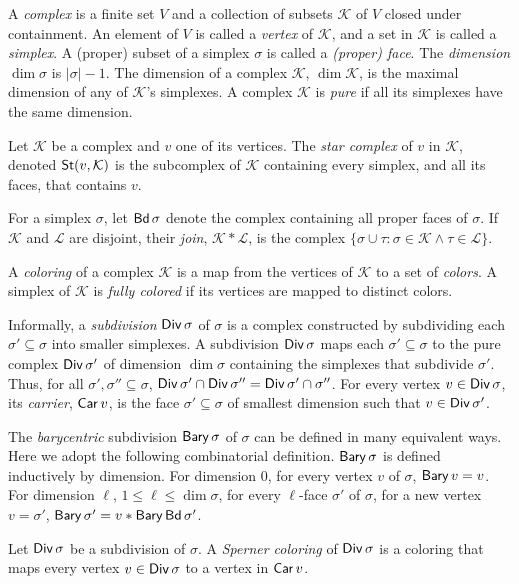 \documentclass[11pt]{article}
\theoremstyle{definition}
\newcommand{\set}[1]{\{#1\}}
\DeclareMathOperator{\Bary}{\sf Bary}
\DeclareMathOperator{\Star}{\sf St}
\DeclareMathOperator{\Car}{\sf Car}
\DeclareMathOperator{\Div}{\sf Div}
\DeclareMathOperator{\bdry}{\sf Bd}
\newcommand{\cK}{\ensuremath{\mathcal{K}}}
\newcommand{\cL}{\ensuremath{\mathcal{L}}}
\begin{document}
A \emph{complex} is a finite set $V$
and a collection of subsets $\cK$ of $V$ closed under containment.
An element of $V$ is called a \emph{vertex} of $\cK$,
and a set in $\cK$ is called a \emph{simplex}.
A (proper) subset of a simplex $\sigma$ is called a \emph{(proper) face}.
The \emph{dimension} $\dim \sigma$ is $|\sigma|-1$.
The dimension of a complex $\cK$, $\dim \cK$,
is the maximal dimension of any of $\cK$'s simplexes.
A complex $\cK$ is \emph{pure} if all its simplexes have the same dimension.

Let $\cK$ be a complex and $v$ one of its vertices.
The \emph{star complex} of $v$ in $\cK$, denoted $\Star(v, \cK)$
is the subcomplex of $\cK$ containing every simplex, and all its faces,
that contains $v$.

For a simplex $\sigma$, let $\bdry \sigma$ denote the
complex containing all proper faces of $\sigma$.
If $\cK$ and $\cL$ are disjoint, their \emph{join}, $\cK \ast \cL$,
is the complex  $\set{ \sigma \cup \tau : \sigma \in \cK \wedge \tau \in \cL}$.

A \emph{coloring} of a complex $\cK$ is a map from the vertices of
$\cK$ to a set of \emph{colors}.
A simplex of $\cK$ is \emph{fully colored} if its vertices are mapped to distinct colors.

Informally, a \emph{subdivision} $\Div \sigma$ of $\sigma$ is a complex
constructed by subdividing each $\sigma' \subseteq \sigma$ into smaller simplexes.
A subdivision $\Div \sigma$ maps each $\sigma' \subseteq \sigma$ to the
pure complex $\Div \sigma'$ of dimension $\dim \sigma$ containing the simplexes that subdivide $\sigma'$.
Thus, for all $\sigma', \sigma'' \subseteq \sigma$,
$\Div \sigma' \cap \Div \sigma'' = \Div \sigma' \cap \sigma''$.
For every vertex $v \in \Div \sigma$,
its \emph{carrier}, $\Car v$,
is the face $\sigma' \subseteq \sigma$ of smallest dimension such that
$v \in \Div \sigma'$.

The \emph{barycentric} subdivision $\Bary \sigma$ of $\sigma$ can be
defined in many equivalent ways. Here we adopt the following
combinatorial definition.
$\Bary \sigma$ is defined inductively by dimension.
For dimension 0, for every vertex $v$ of $\sigma$,
$\Bary v = v$.
For dimension $\ell$, $1 \leq \ell \leq \dim \sigma$,
for every $\ell$-face $\sigma'$ of $\sigma$,
for a new vertex $v = \sigma'$,
$\Bary \sigma' = v \ast \Bary \bdry \sigma'$.

Let $\Div \sigma$ be a subdivision of $\sigma$.
A \emph{Sperner coloring} of $\Div \sigma$ is a coloring
that maps every vertex $v \in \Div \sigma$ to a vertex in $\Car v$.
\end{document}
